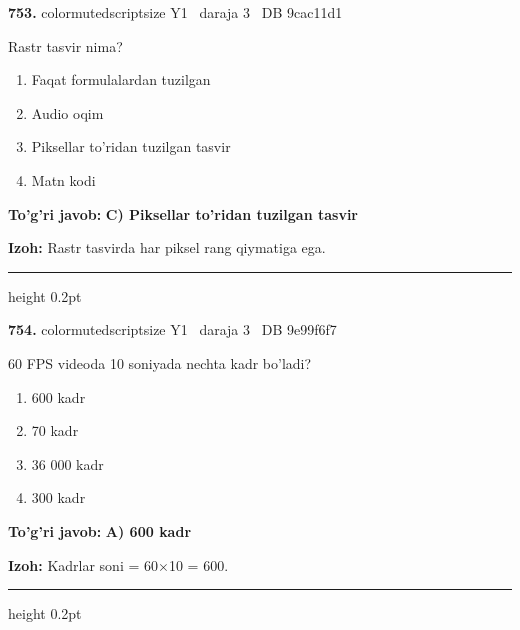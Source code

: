 \documentclass[10pt,a4paper,oneside]{article}
\begin{document}
\noindent\textbf{\color{ink}753.}  {color{muted}scriptsize Y1 \textbullet\ daraja 3 \textbullet\ DB 9cac11d1}
\par
Rastr tasvir nima?
\begin{enumerate}[label=\Alph*),leftmargin=9mm]
\item Faqat formulalardan tuzilgan
\item Audio oqim
\item Piksellar to'ridan tuzilgan tasvir
\item Matn kodi
\end{enumerate}
\begin{tcolorbox}[enhanced,breakable,colback=teal!4,colframe=teal!50!black,boxrule=0.5pt,arc=1.1mm,left=3mm,right=3mm,top=1.7mm,bottom=1.7mm,before skip=2mm,after skip=2mm]
\textbf{\color{teal}To'g'ri javob:} \textbf{C) Piksellar to'ridan tuzilgan tasvir}
\par\smallskip
\textbf{Izoh:} Rastr tasvirda har piksel rang qiymatiga ega.
\end{tcolorbox}
\vspace{2mm}\hrule height 0.2pt \vspace{3mm}

\noindent\textbf{\color{ink}754.}  {color{muted}scriptsize Y1 \textbullet\ daraja 3 \textbullet\ DB 9e99f6f7}
\par
60 FPS videoda 10 soniyada nechta kadr bo'ladi?
\begin{enumerate}[label=\Alph*),leftmargin=9mm]
\item 600 kadr
\item 70 kadr
\item 36 000 kadr
\item 300 kadr
\end{enumerate}
\begin{tcolorbox}[enhanced,breakable,colback=teal!4,colframe=teal!50!black,boxrule=0.5pt,arc=1.1mm,left=3mm,right=3mm,top=1.7mm,bottom=1.7mm,before skip=2mm,after skip=2mm]
\textbf{\color{teal}To'g'ri javob:} \textbf{A) 600 kadr}
\par\smallskip
\textbf{Izoh:} Kadrlar soni = 60\ensuremath{\times}10 = 600.
\end{tcolorbox}
\vspace{2mm}\hrule height 0.2pt \vspace{3mm}
\end{document}
